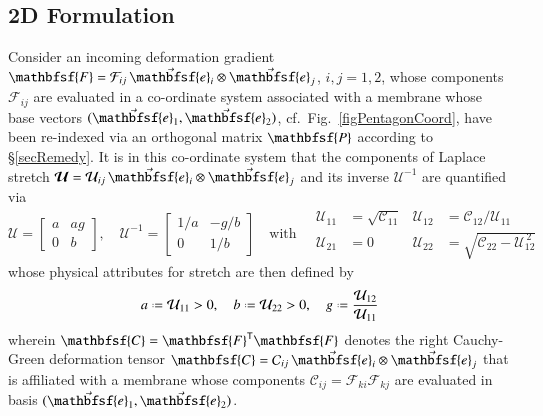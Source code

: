 \subsection{2D Formulation}

Consider an incoming deformation gradient $\mathbfsf{F} = \mathcal{F}_{ij} \, \vec{\mathbfsf{e}}_i \otimes \vec{\mathbfsf{e}}_j$, $i, j = 1, 2$, whose components $\mathcal{F}_{ij}$ are evaluated in a co-ordinate system associated with a membrane whose base vectors $( \vec{\mathbfsf{e}}_1 , \vec{\mathbfsf{e}}_2 )$, cf.\ Fig.~\ref{figPentagonCoord}, have been re-indexed via an orthogonal matrix $\mathbfsf{P}$ according to \S\ref{secRemedy}.  It is in this co-ordinate system that the components of Laplace stretch $\boldsymbol{\mathcal{U}} = \mathcal{U}_{ij} \, \vec{\mathbfsf{e}}_i \otimes \vec{\mathbfsf{e}}_j$ and its inverse $\boldsymbol{\mathcal{U}}^{-1}$ are quantified via
\begin{equation} 
   \boldsymbol{\mathcal{U}} = \begin{bmatrix}
   a & a g \\ 0 & b
   \end{bmatrix} , \quad 
   \boldsymbol{\mathcal{U}}^{-1} = \begin{bmatrix}
   1/a & -g / b \\ 0 & 1/b
   \end{bmatrix}
   \quad \text{with} \quad
   \begin{aligned}
   \mathcal{U}_{11} & = \sqrt{\mathcal{C}_{11}} & \mathcal{U}_{12} & 
   = \mathcal{C}_{12} / \mathcal{U}_{11} \\
   \mathcal{U}_{21} & = 0 & \mathcal{U}_{22} & 
   = \sqrt{\mathcal{C}_{22} - \mathcal{U}_{12}^{\,2}}
   \end{aligned}
\end{equation}
whose physical attributes for stretch are then defined by
\begin{equation}
    a \defeq \mathcal{U}_{11} > 0 , \quad
    b \defeq \mathcal{U}_{22} > 0 , \quad
    g \defeq \frac{\mathcal{U}_{12}}{\mathcal{U}_{11}}
\end{equation}
wherein $\mathbfsf{C} = \mathbfsf{F}^{\mathsf{T}} \mathbfsf{F}$ denotes the right Cauchy-Green deformation tensor $\mathbfsf{C} = \mathcal{C}_{ij} \, \vec{\mathbfsf{e}}_i \otimes \vec{\mathbfsf{e}}_j$ that is affiliated with a membrane whose components $\mathcal{C}_{ij} = \mathcal{F}_{ki} \mathcal{F}_{kj}$ are evaluated in basis $( \vec{\mathbfsf{e}}_1 , \vec{\mathbfsf{e}}_2 )$.

